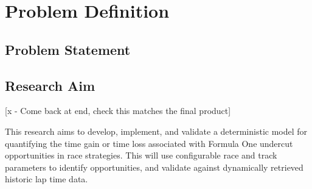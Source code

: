 \chapter{Problem Definition}
\label{chap:problem}


\section{Problem Statement}
\label{sec:problem-statement}

%

\section{Research Aim}
\label{sec:research-aim}


[x - Come back at end, check this matches the final product]

This research aims to develop, implement, and validate a deterministic model for quantifying the time gain or time loss associated with Formula One undercut opportunities in race strategies. This will use configurable race and track parameters to identify opportunities, and validate against dynamically retrieved historic lap time data.

